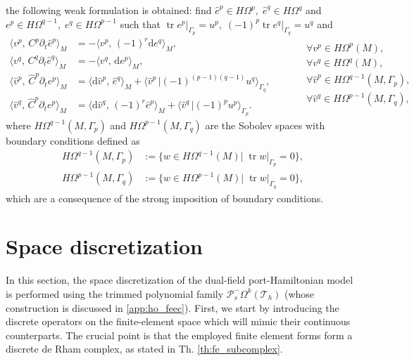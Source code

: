 \documentclass{elsarticle}
\renewcommand\d{\ensuremath{\mathrm{d}}}
\DeclareMathOperator{\tr}{tr}
\newcommand*{\dual}[1]{\ensuremath{\widehat{#1}}}
\newcommand{\inpr}[3][]{\ensuremath{\langle #2, \, #3 \rangle_{#1}}}
\newcommand{\dualpr}[3][]{\ensuremath{\langle #2 \, \vert #3 \rangle_{#1}}}
\begin{document}
the following weak formulation is obtained: find $\dual{e}^p \in H\Omega^{p}, \; \dual{e}^q \in H\Omega^{q}$ and ${e}^p \in H\Omega^{q-1}, \; e^q \in H\Omega^{p-1}$ such that $\tr e^p \vert_{\Gamma_p} = u^p, \; (-1)^p \tr e^q \vert_{\Gamma_q} = u^q$ and
 \begin{equation}\label{eq:weak_dfPHdyn}
    \begin{aligned}
    \inpr[M]{v^p}{C^p \partial_t \dual{e}^p} &= -\inpr[M]{v^p}{(-1)^r\d e^q}, \\
    \inpr[M]{v^q}{C^q \partial_t \dual{e}^q} &= -\inpr[M]{v^q}{\d e^p}, \\
    \inpr[M]{\dual{v}^p}{\dual{C}^p \partial_t e^p} &=\inpr[M]{\d\dual{v}^p}{\dual{e}^q} + \dualpr[\Gamma_q]{\dual{v}^p}{(-1)^{(p-1)(q-1)}u^q}, \\
      \inpr[M]{\dual{v}^q}{\dual{C}^p \partial_t e^p} &= \inpr[M]{\d\dual{v}^q}{(-1)^{r} \dual{e}^p} + \dualpr[\Gamma_p]{\dual{v}^q}{(-1)^{p}u^p}. 
    \end{aligned}  \qquad 
    \begin{aligned}
    &\forall v^p \in H\Omega^p(M), \\
    &\forall v^q \in H\Omega^q(M), \\
    &\forall \dual{v}^p \in H\Omega^{q-1}(M, \Gamma_p), \\
    &\forall \dual{v}^q \in H\Omega^{p-1}(M, \Gamma_q), \\
    \end{aligned}
 \end{equation}
where $H\Omega^{q-1}(M, \Gamma_p)$ and $H\Omega^{p-1}(M, \Gamma_q)$ are the Sobolev spaces with boundary conditions defined as 
\begin{equation}
    \begin{aligned}
        H\Omega^{q-1}(M, \Gamma_p) &:= \{w \in H\Omega^{q-1}(M) \vert \; \tr w\vert_{\Gamma_p} = 0 \}, \\
        H\Omega^{p-1}(M, \Gamma_q) &:= \{w \in H\Omega^{p-1}(M) \vert \; \tr w\vert_{\Gamma_q} = 0 \},
    \end{aligned}
\end{equation}
which are a consequence of the strong imposition of boundary conditions.

\section{Space discretization}\label{sec:space_discr}

In this section, the space discretization of the dual-field port-Hamiltonian model is performed using the trimmed polynomial family $\mathcal{P}^-_s\Omega^k(\mathcal{T}_h)$ (whose construction is discussed in \ref{app:ho_feec}).
First, we start by introducing the discrete operators on the finite-element space which will mimic their continuous counterparts.
The crucial point is that the employed finite element forms form a discrete de Rham complex, as stated in Th. \ref{th:fe_subcomplex}.
\end{document}
